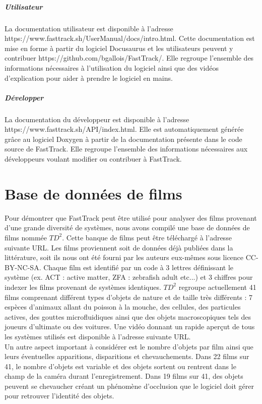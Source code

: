 		\paragraph{Utilisateur} La documentation utilisateur est disponible à l'adresse https://www.fasttrack.sh/UserManual/docs/intro.html. Cette documentation est mise en forme à partir du logiciel Docusaurus et les utilisateurs peuvent y contribuer https://github.com/bgallois/FastTrack/. Elle regroupe l'ensemble des informations nécessaires à l'utilisation du logiciel ainsi que des vidéos d'explication pour aider à prendre le logiciel en mains.
		
		\paragraph{Développer} La documentation du développeur est disponible à l'adresse https://www.fasttrack.sh/API/index.html. Elle est automatiquement générée grâce au logiciel Doxygen à partir de la documentation présente dans le code source de FastTrack. Elle regroupe l'ensemble des informations nécessaires aux développeurs voulant modifier ou contribuer à FastTrack.

		
\chapter{Base de données de films}
    
    Pour démontrer que FastTrack peut être utilisé pour analyser des films provenant d'une grande diversité de systèmes, nous avons compilé une base de données de films nommée $TD^2$. Cette banque de films peut être téléchargé à l'adresse suivante URL. Les films proviennent soit de données déjà publiées dans la littérature, soit ils nous ont été fourni par les auteurs eux-mêmes sous licence CC-BY-NC-SA. Chaque film est identifié par un code à 3 lettres définissant le système (ex. ACT : active matter, ZFA : zebrafish adult etc...) et 3 chiffres pour indexer les films provenant de systèmes identiques. $TD^2$ regroupe actuellement 41 films comprenant différent types d'objets de nature et de taille très différents : 7 espèces d'animaux allant du poisson à la mouche, des cellules, des particules actives, des gouttes microfluidiques ainsi que des objets macroscopiques tels des joueurs d'ultimate ou des voitures. Une vidéo donnant un rapide aperçut de tous les systèmes utilisés est disponible à l'adresse suivante URL.\\

    Un autre aspect important à considérer est le nombre d'objets par film ainsi que leurs éventuelles apparitions, disparitions et chevauchements. Dans 22 films sur 41, le nombre d'objets est variable et des objets sortent ou rentrent dans le champ de la caméra durant l'enregistrement. Dans 19 films sur 41, des objets peuvent se chevaucher créant un phénomène d'occlusion que le logiciel doit gérer pour retrouver l'identité des objets.

